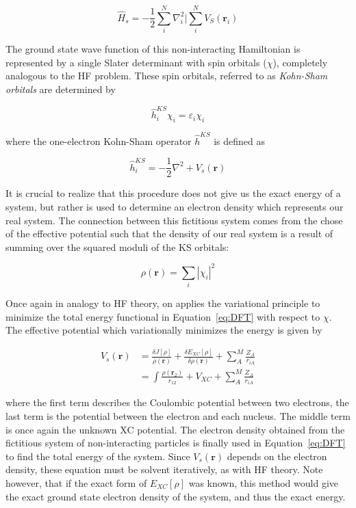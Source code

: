 \begin{equation}
  \hat{H}_s = -\frac{1}{2}\sum_i^N\nabla_i^2 | \sum_i^N V_S(\mathbf{r}_i)
\end{equation}

\noindent The ground state wave function of this non-interacting Hamiltonian is
represented by a single Slater determinant with spin orbitals ($\chi$),
completely analogous to the HF problem. These spin orbitals, referred to as
\emph{Kohn-Sham orbitals} are determined by

\begin{equation}
  \hat{h}_i^{KS} \chi_i = \varepsilon_i \chi_i
  \label{eq:kohnsham}
\end{equation}

\noindent where the one-electron Kohn-Sham operator $\hat{h}^{KS}$ is defined
as

\begin{equation}
  \hat{h}_i^{KS} = -\frac{1}{2}\nabla^2 + V_s(\mathbf{r})
  \label{eq:ksoperator}
\end{equation}

It is crucial to realize that this procedure does not give us the exact energy
of a system, but rather is used to determine an electron density which
represents our real system. The connection between this fictitious system comes
from the chose of the effective potential such that the density of our real
system is a result of summing over the squared moduli of the KS orbitals:

\begin{equation}
  \rho(\mathbf{r}) = \sum_i | \chi_i |^2
\end{equation}

Once again in analogy to HF theory, on applies the variational principle to
minimize the total energy functional in Equation~\ref{eq:DFT} with respect to
$\chi$. The effective potential which variationally minimizes the energy is
given by\cite{Parr1995}

\begin{equation}
\begin{split}
  V_s(\mathbf{r}) &= \frac{\delta J[\rho]}{\rho(\mathbf{r})} + \frac{\delta E_{XC}[\rho]}{\delta \rho(\mathbf{r})} + \sum_A^M \frac{Z_A}{r_{iA}} \\
  &= \int\frac{\rho(\mathbf{r}_2)}{r_{12}} + V_{XC} + \sum_A^M \frac{Z_A}{r_{iA}}
\end{split}
\end{equation}

\noindent where the first term describes the Coulombic potential between two
electrons, the last term is the potential between the electron and each
nucleus. The middle term is once again the unknown XC potential. The electron
density obtained from the fictitious system of non-interacting particles is
finally used in Equation~\ref{eq:DFT} to find the total energy of the system.
Since $V_s(\mathbf{r})$ depends on the electron density, these equation must be
solvent iteratively, as with HF theory. Note however, that if the exact form of
$E_{XC}[\rho]$ was known, this method would give the exact ground state
electron density of the system, and thus the exact energy.

